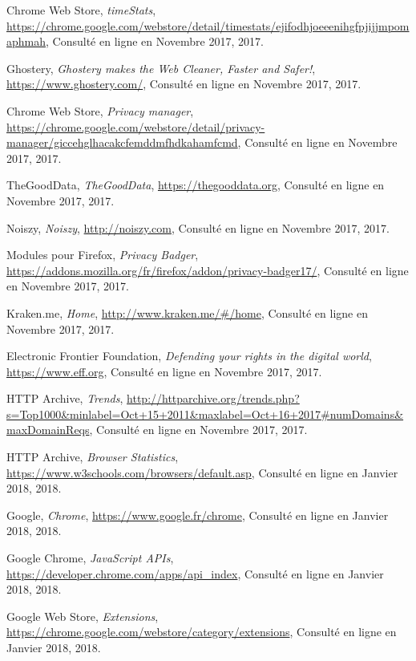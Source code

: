 \begin{thebibliography}{9}
  Chrome Web Store,
  \emph{timeStats},
  \url{https://chrome.google.com/webstore/detail/timestats/ejifodhjoeeenihgfpjijjmpomaphmah},
  Consulté en ligne en Novembre 2017,
  2017.

  Ghostery,
  \emph{Ghostery makes the Web Cleaner, Faster and Safer!},
  \url{https://www.ghostery.com/},
  Consulté en ligne en Novembre 2017,
  2017.

  Chrome Web Store,
  \emph{Privacy manager},
  \url{https://chrome.google.com/webstore/detail/privacy-manager/giccehglhacakcfemddmfhdkahamfcmd},
  Consulté en ligne en Novembre 2017,
  2017.

  TheGoodData,
  \emph{TheGoodData},
  \url{https://thegooddata.org},
  Consulté en ligne en Novembre 2017,
  2017.

  Noiszy,
  \emph{Noiszy},
  \url{http://noiszy.com},
  Consulté en ligne en Novembre 2017,
  2017.

  Modules pour Firefox,
  \emph{Privacy Badger},
  \url{https://addons.mozilla.org/fr/firefox/addon/privacy-badger17/},
  Consulté en ligne en Novembre 2017,
  2017.

  Kraken.me,
  \emph{Home},
  \url{http://www.kraken.me/#/home},
  Consulté en ligne en Novembre 2017,
  2017.

  Electronic Frontier Foundation,
  \emph{Defending your rights in the digital world},
  \url{https://www.eff.org},
  Consulté en ligne en Novembre 2017,
  2017.

  HTTP Archive,
  \emph{Trends},
  \url{http://httparchive.org/trends.php?s=Top1000&minlabel=Oct+15+2011&maxlabel=Oct+16+2017#numDomains&maxDomainReqs},
  Consulté en ligne en Novembre 2017,
  2017.

  HTTP Archive,
  \emph{Browser Statistics},
  \url{https://www.w3schools.com/browsers/default.asp},
  Consulté en ligne en Janvier 2018,
  2018.

  Google,
  \emph{Chrome},
  \url{https://www.google.fr/chrome},
  Consulté en ligne en Janvier 2018,
  2018.

  Google Chrome,
  \emph{JavaScript APIs},
  \url{https://developer.chrome.com/apps/api_index},
  Consulté en ligne en Janvier 2018,
  2018.

  Google Web Store,
  \emph{Extensions},
  \url{https://chrome.google.com/webstore/category/extensions},
  Consulté en ligne en Janvier 2018,
  2018.

\end{thebibliography}

